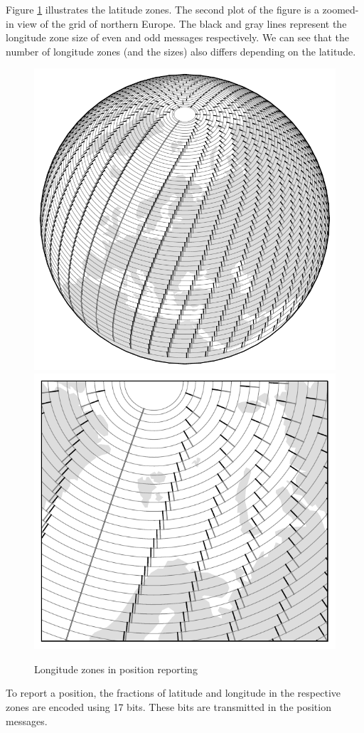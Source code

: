 Figure \ref{fig:cpr_lon_zones} illustrates the latitude zones. The second plot of the figure is a zoomed-in view of the grid of northern Europe. The black and gray lines represent the longitude zone size of even and odd messages respectively. We can see that the number of longitude zones (and the sizes) also differs depending on the latitude.

\begin{figure}
  \includegraphics[width=0.7\linewidth]{figures/adsb/cpr_lon_zone_full.pdf}
  \\
  \vspace{0.5cm}
  \includegraphics[width=0.7\linewidth]{figures/adsb/cpr_lon_zone_zoom.pdf}
  \caption{Longitude zones in position reporting}
  \label{fig:cpr_lon_zones}
\end{figure}

To report a position, the fractions of latitude and longitude in the respective zones are encoded using 17 bits. These bits are transmitted in the position messages.


